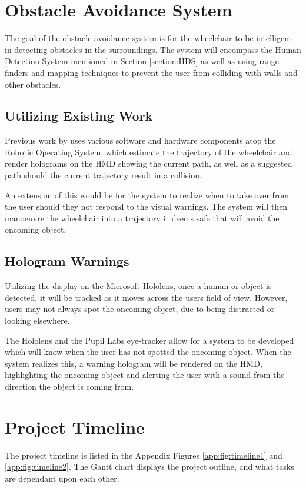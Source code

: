 \documentclass[12pt,a4paper]{report}
\begin{document}
\section{Obstacle Avoidance System} \label{section:OAS}
The goal of the obstacle avoidance system is for the wheelchair to be intelligent in detecting obstacles in the surroundings. The system will encompass the Human Detection System mentioned in Section \ref{section:HDS} as well as using range finders and mapping techniques to prevent the user from colliding with walls and other obstacles.

\subsection{Utilizing Existing Work}
Previous work by \cite{Zolotas2018} uses various software and hardware components atop the Robotic Operating System, which estimate the trajectory of the wheelchair and render holograms on the HMD showing the current path, as well as a suggested path should the current trajectory result in a collision.

An extension of this would be for the system to realize when to take over from the user should they not respond to the visual warnings. The system will then manoeuvre the wheelchair into a trajectory it deems safe that will avoid the oncoming object.

\subsection{Hologram Warnings}
Utilizing the display on the Microsoft Hololens, once a human or object is detected, it will be tracked as it moves across the users field of view. However, users may not always spot the oncoming object, due to being distracted or looking elsewhere.

The Hololens and the Pupil Labs eye-tracker allow for a system to be developed which will know when the user has not spotted the oncoming object. When the system realizes this, a warning hologram will be rendered on the HMD, highlighting the oncoming object and alerting the user with a sound from the direction the object is coming from.

\section{Project Timeline}
The project timeline is listed in the Appendix Figures \ref{app:fig:timeline1} and \ref{app:fig:timeline2}. The Gantt chart displays the project outline, and what tasks are dependant upon each other.
\end{document}
